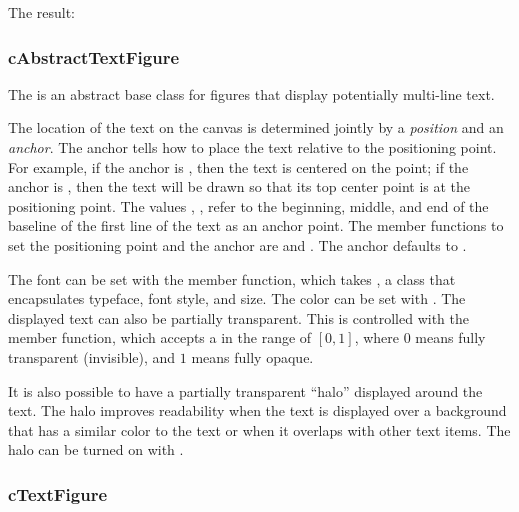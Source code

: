 
The result:

\begin{center}

\end{center}

\subsubsection{cAbstractTextFigure}
\label{sec:graphics:abstracttextfigure}

The  is an abstract base class for figures that
display potentially multi-line text.

The location of the text on the canvas is determined jointly by a
\textit{position} and an \textit{anchor}. The anchor tells how to
place the text relative to the positioning point. For example,
if the anchor is , then the text is centered on the point;
if the anchor is , then the text will be drawn so that its top
center point is at the positioning point. The values
, ,
 refer to the beginning, middle, and end of the
baseline of the first line of the text as an anchor point. The member
functions to set the positioning point and the anchor are
 and . The anchor defaults to
.

The font can be set with the  member function, which takes
, a class that encapsulates typeface, font style, and
size. The color can be set with . The displayed text can
also be partially transparent. This is controlled with the 
member function, which accepts a  in the range of $[0,1]$, where $0$ means
fully transparent (invisible), and $1$ means fully opaque.

It is also possible to have a partially transparent ``halo'' displayed around
the text. The halo improves readability when the text is displayed over a
background that has a similar color to the text or when it overlaps with other
text items. The halo can be turned on with .


\subsubsection{cTextFigure}
\label{sec:graphics:textfigure}

